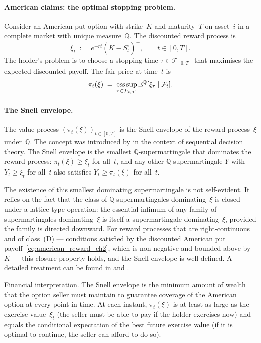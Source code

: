 \paragraph{American claims: the optimal stopping problem.}
Consider an American put option with strike~$K$ and maturity~$T$ on
asset~$i$ in a complete market with unique measure~$\mathbb{Q}$.  The
discounted reward process is
\begin{equation}
\label{eq:american_reward_ch2}
\xi_t \;:=\; e^{-rt}(K - S^i_t)^+, \qquad t \in [0,T].
\end{equation}
The holder's problem is to choose a stopping time $\tau \in
\mathcal{T}_{[0,T]}$ that maximises the expected discounted payoff.
The fair price at time~$t$ is
\begin{equation}
\label{eq:american_price_complete}
\pi_t(\xi) \;=\;
\operatorname*{ess\,sup}_{\tau \in \mathcal{T}_{[t,T]}}
\mathbb{E}^{\mathbb{Q}}[\xi_\tau \mid \mathcal{F}_t].
\end{equation}

\paragraph{The Snell envelope.}
The value process $(\pi_t(\xi))_{t \in [0,T]}$ is the Snell
envelope of the reward process~$\xi$ under~$\mathbb{Q}$.  The concept
was introduced by \citet{Snell1952} in the context of sequential decision
theory.  The Snell envelope is the smallest $\mathbb{Q}$-supermartingale
that dominates the reward process: $\pi_t(\xi) \ge \xi_t$ for all~$t$,
and any other $\mathbb{Q}$-supermartingale $Y$ with $Y_t \ge \xi_t$ for
all~$t$ also satisfies $Y_t \ge \pi_t(\xi)$ for all~$t$.

The existence of this smallest dominating supermartingale is not
self-evident.  It relies on the fact that the class of
$\mathbb{Q}$-supermartingales dominating~$\xi$ is closed under a
lattice-type operation: the essential infimum of any family of
supermartingales dominating~$\xi$ is itself a supermartingale
dominating~$\xi$, provided the family is directed downward.  For reward
processes that are right-continuous and of class~(D) --- conditions
satisfied by the discounted American put payoff~\eqref{eq:american_reward_ch2},
which is non-negative and bounded above by~$K$ --- this closure property
holds, and the Snell envelope is well-defined.  A detailed treatment can
be found in \citet{KaratzasShreve1998} and \citet{Peskir2006}.

\noindent Financial interpretation.  The Snell envelope is the
minimum amount of wealth that the option seller must maintain to guarantee
coverage of the American option at every point in time.  At each
instant, $\pi_t(\xi)$ is at least as large as the exercise value~$\xi_t$
(the seller must be able to pay if the holder exercises now) and equals
the conditional expectation of the best future exercise value (if it is
optimal to continue, the seller can afford to do so).


